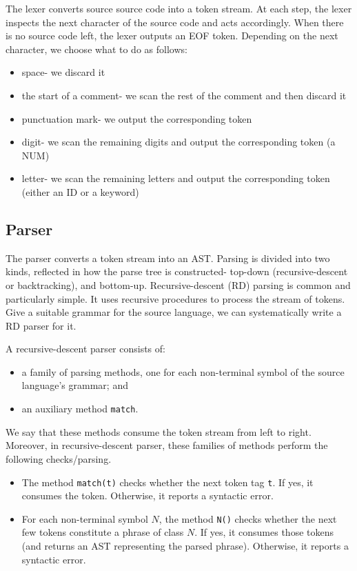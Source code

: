 \documentclass[a4paper, openany]{memoir}
\begin{document}
The lexer converts source source code into a token stream. At each step, the lexer inspects the next character of the source code and acts accordingly. When there is no source code left, the lexer outputs an EOF token. Depending on the next character, we choose what to do as follows:
\begin{itemize}
    \item space- we discard it
    \item the start of a comment- we scan the rest of the comment and then discard it
    \item punctuation mark- we output the corresponding token
    \item digit- we scan the remaining digits and output the corresponding token (a NUM)
    \item letter- we scan the remaining letters and output the corresponding token (either an ID or a keyword)
\end{itemize}

\subsection{Parser}
The parser converts a token stream into an AST. Parsing is divided into two kinds, reflected in how the parse tree is constructed- top-down (recursive-descent or backtracking), and bottom-up. Recursive-descent (RD) parsing is common and particularly simple. It uses recursive procedures to process the stream of tokens. Give a suitable grammar for the source language, we can systematically write a RD parser for it.

A recursive-descent parser consists of:
\begin{itemize}
    \item a family of parsing methods, one for each non-terminal symbol of the source language's grammar; and
    \item an auxiliary method \texttt{match}.
\end{itemize}
We say that these methods consume the token stream from left to right. Moreover, in recursive-descent parser, these families of methods perform the following checks/parsing.
\begin{itemize}
    \item The method \texttt{match(t)} checks whether the next token tag \texttt{t}. If yes, it consumes the token. Otherwise, it reports a syntactic error.
    \item For each non-terminal symbol $N$, the method \texttt{N()} checks whether the next few tokens constitute a phrase of class $N$. If yes, it consumes those tokens (and returns an AST representing the parsed phrase). Otherwise, it reports a syntactic error.
\end{itemize}
\end{document}
